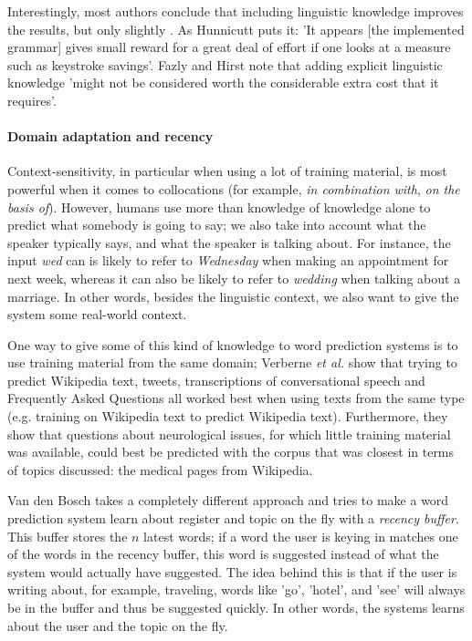 \documentclass[11pt]{article}
\begin{document}
Interestingly, most authors conclude that including linguistic knowledge improves the results, but only slightly \cite{garay-vitoria+97,Fazly+03}. As Hunnicutt  puts it: 'It appears [the implemented grammar] gives small reward for a great deal of effort if one looks at a measure such as keystroke savings'. Fazly and Hirst  note that adding explicit linguistic knowledge 'might not be considered worth the considerable extra cost that it requires'.

\paragraph{Domain adaptation and recency}

Context-sensitivity, in particular when using a lot of training material, is most powerful when it comes to collocations (for example, \emph{in combination with}, \emph{on the basis of}). However, humans use more than knowledge of knowledge alone to predict what somebody is going to say; we also take into account what the speaker typically says, and what the speaker is talking about. For instance, the input \emph{wed} can is likely to refer to \emph{Wednesday} when making an appointment for next week, whereas it can also be likely to refer to \emph{wedding} when talking about a marriage. In other words, besides the linguistic context, we also want to give the system some real-world context.

One way to give some of this kind of knowledge to word prediction systems is to use training material from the same domain; Verberne {\em et al.}  show that trying to predict Wikipedia text, tweets, transcriptions of conversational speech and Frequently Asked Questions all worked best when using texts from the same type (e.g. training on Wikipedia text to predict Wikipedia text). Furthermore, they show that questions about neurological issues, for which little training material was available, could best be predicted with the corpus that was closest in terms of topics discussed: the medical pages from Wikipedia. 

Van den Bosch  takes a completely different approach and tries to make a word prediction system learn about register and topic on the fly with a \emph{recency buffer}. This buffer stores the $n$ latest words; if a word the user is keying in matches one of the words in the recency buffer, this word is suggested instead of what the system would actually have suggested. The idea behind this is that if the user is writing about, for example, traveling, words like 'go', 'hotel', and 'see' will always be in the buffer and thus be suggested quickly. In other words, the systems learns about the user and the topic on the fly.
\end{document}
